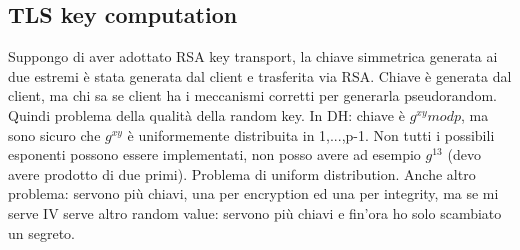 \documentclass[16px]{article}
\begin{document}
\subsection{TLS key computation}
Suppongo di aver adottato RSA key transport, la chiave simmetrica generata ai due estremi è stata generata dal client e trasferita via RSA. Chiave è generata dal client, ma chi sa se client ha i meccanismi corretti per generarla pseudorandom. Quindi problema della qualità della random key. In DH: chiave è $g^{xy}modp$, ma sono sicuro che $g^{xy}$ è uniformemente distribuita in 1,...,p-1. Non tutti i possibili esponenti possono essere implementati, non posso avere ad esempio $g^{13}$ (devo avere prodotto di due primi). Problema di uniform distribution. Anche altro problema: servono più chiavi, una per encryption ed una per integrity, ma se mi serve IV serve altro random value: servono più chiavi e fin'ora ho solo scambiato un segreto.
\end{document}

